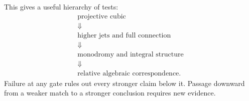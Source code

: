 This gives a useful hierarchy of tests:
\[
\begin{array}{c}
\text{projective cubic}\\
\Downarrow\\
\text{higher jets and full connection}\\
\Downarrow\\
\text{monodromy and integral structure}\\
\Downarrow\\
\text{relative algebraic correspondence}.
\end{array}
\]
Failure at any gate rules out every stronger claim below it.  Passage
downward from a weaker match to a stronger conclusion requires new evidence.
